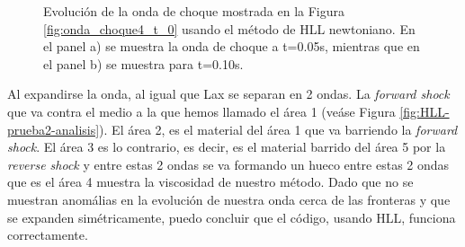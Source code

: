 \documentclass[12pt,a4paper]{book}
\begin{document}
\begin{figure}
\caption{\label{fig:HLL-prueba2}Evolución de la onda de choque mostrada en la Figura \ref{fig:onda_choque4_t_0} usando el método de HLL newtoniano. En el panel a) se muestra la onda de choque a t=0.05s, mientras que en el panel b) se muestra para t=0.10s.}  
\end{figure}

Al expandirse la onda, al igual que Lax se separan en 2 ondas. La \emph{forward shock} que va contra el medio a la que hemos llamado el área 1 (veáse Figura \ref{fig:HLL-prueba2-analisis}). El área 2, es el material del área 1 que va barriendo la \emph{forward shock}. El área 3 es lo contrario, es decir, es el material barrido del área 5 por la \emph{reverse shock} y entre estas 2 ondas se va formando un hueco entre estas 2 ondas que es el área 4 muestra la viscosidad de nuestro método. Dado  que no se muestran anomálias en la evolución de nuestra onda cerca de las fronteras y que se expanden simétricamente, puedo concluir que el código, usando HLL, funciona correctamente.
\end{document}
